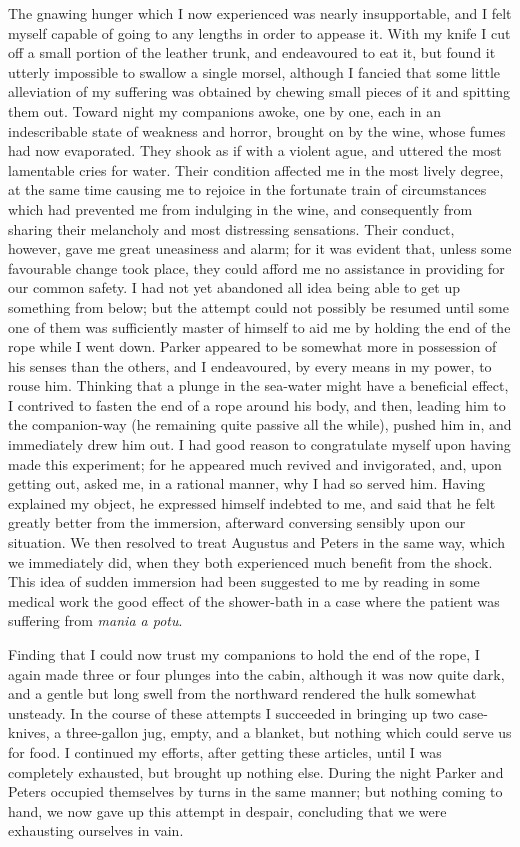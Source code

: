 The gnawing hunger which I now experienced was nearly insupportable, and I
felt myself capable of going to any lengths in order to appease it. With my
knife I cut off a small portion of the leather trunk, and endeavoured to eat it,
but found it utterly impossible to swallow a single morsel, although I fancied
that some little alleviation of my suffering was obtained by chewing small
pieces of it and spitting them out. Toward night my companions awoke, one by
one, each in an indescribable state of weakness and horror, brought on by the
wine, whose fumes had now evaporated. They shook as if with a violent ague, and
uttered the most lamentable cries for water. Their condition affected me in the
most lively degree, at the same time causing me to rejoice in the fortunate
train of circumstances which had prevented me from indulging in the wine, and
consequently from sharing their melancholy and most distressing sensations.
Their conduct, however, gave me great uneasiness and alarm; for it was evident
that, unless some favourable change took place, they could afford me no
assistance in providing for our common safety. I had not yet abandoned all idea
being able to get up something from below; but the attempt could not possibly be
resumed until some one of them was sufficiently master of himself to aid me by
holding the end of the rope while I went down. Parker appeared to be somewhat
more in possession of his senses than the others, and I endeavoured, by every
means in my power, to rouse him. Thinking that a plunge in the sea-water might
have a beneficial effect, I contrived to fasten the end of a rope around his
body, and then, leading him to the companion-way (he remaining quite passive all
the while), pushed him in, and immediately drew him out. I had good reason to
congratulate myself upon having made this experiment; for he appeared much
revived and invigorated, and, upon getting out, asked me, in a rational manner,
why I had so served him. Having explained my object, he expressed himself
indebted to me, and said that he felt greatly better from the immersion,
afterward conversing sensibly upon our situation. We then resolved to treat
Augustus and Peters in the same way, which we immediately did, when they both
experienced much benefit from the shock. This idea of sudden immersion had been
suggested to me by reading in some medical work the good effect of the
shower-bath in a case where the patient was suffering from \emph{mania a
potu}. 

Finding that I could now trust my companions to hold the end of the rope, I
again made three or four plunges into the cabin, although it was now quite dark,
and a gentle but long swell from the northward rendered the hulk somewhat
unsteady. In the course of these attempts I succeeded in bringing up two
case-knives, a three-gallon jug, empty, and a blanket, but nothing which could
serve us for food. I continued my efforts, after getting these articles, until I
was completely exhausted, but brought up nothing else. During the night Parker
and Peters occupied themselves by turns in the same manner; but nothing coming
to hand, we now gave up this attempt in despair, concluding that we were
exhausting ourselves in vain. 

